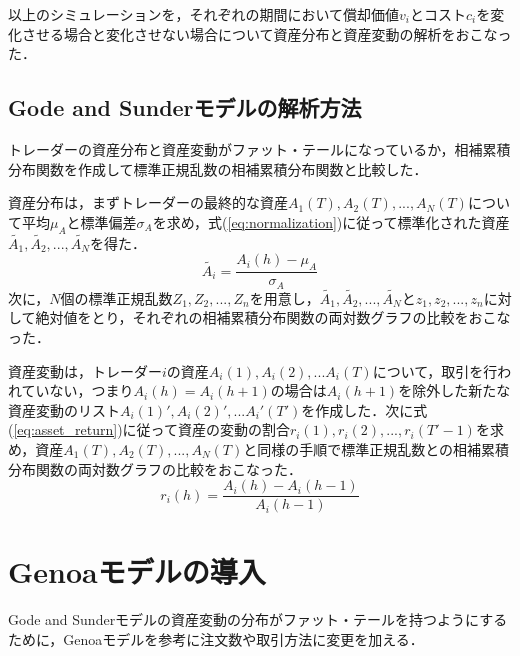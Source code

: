 \documentclass[titlepage]{jsreport}
\begin{document}
以上のシミュレーションを，それぞれの期間において償却価値$v_i$とコスト$c_i$を変化させる場合と変化させない場合について資産分布と資産変動の解析をおこなった．

\subsection{Gode and Sunderモデルの解析方法}
トレーダーの資産分布と資産変動がファット・テールになっているか，相補累積分布関数を作成して標準正規乱数の相補累積分布関数と比較した．

資産分布は，まずトレーダーの最終的な資産$A_1(T), A_2(T), ..., A_N(T)$について平均$\mu_A$と標準偏差$\sigma_A$を求め，式(\ref{eq:normalization})に従って標準化された資産$\tilde{A_1}, \tilde{A_2}, ..., \tilde{A_N}$を得た．
\begin{equation}
    \tilde{A_i} = \frac{A_i(h) - \mu_A}{\sigma_A} \label{eq:normalization}
\end{equation}
次に，$N$個の標準正規乱数$Z_1, Z_2, ..., Z_n$を用意し，$\tilde{A_1}, \tilde{A_2}, ..., \tilde{A_N}$と$z_1, z_2, ..., z_n$に対して絶対値をとり，それぞれの相補累積分布関数の両対数グラフの比較をおこなった．

資産変動は，トレーダー$i$の資産$A_i(1), A_i(2), ...A_i(T)$について，取引を行われていない，つまり$A_i(h) = A_i(h + 1)$の場合は$A_i(h + 1)$を除外した新たな資産変動のリスト$A_i(1)', A_i(2)', ...A_i'(T')$を作成した．次に式(\ref{eq:asset_return})に従って資産の変動の割合$r_i(1), r_i(2), ..., r_i(T' - 1)$を求め，資産$A_1(T), A_2(T), ..., A_N(T)$と同様の手順で標準正規乱数との相補累積分布関数の両対数グラフの比較をおこなった．
\begin{equation}
    r_i(h) = \frac{A_i(h) - A_i(h - 1)}{A_i(h - 1)} \label{eq:asset_return}
\end{equation}

\section{Genoaモデルの導入}
Gode and Sunderモデルの資産変動の分布がファット・テールを持つようにするために，Genoaモデルを参考に注文数や取引方法に変更を加える．
\end{document}
